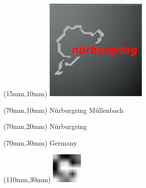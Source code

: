 \null\newpage
\begin{textblock*}{50mm}(15mm,10mm)%
\includegraphics[width=50mm]{LG/2015-05-20_00089.png}
\end{textblock*}
\begin{textblock*}{130mm}(70mm,10mm)%
{\fontsize{20}{20}\selectfont Nürburgring Müllenbach}\\
\end{textblock*}
\begin{textblock*}{120mm}(70mm,20mm)%
{\fontsize{16}{16}\selectfont Nürburgring}\\
\end{textblock*}
\begin{textblock*}{120mm}(70mm,30mm)%
{\fontsize{12}{12}\selectfont Germany}
\end{textblock*}
\begin{textblock*}{30mm}(110mm,30mm)%
\centering
\includegraphics[height=15mm]{icons/fa-rotate-right.pdf}
\end{textblock*}
